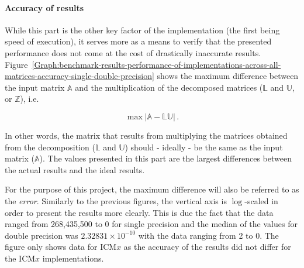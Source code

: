 \paragraph{Accuracy of results} While this part is the other key factor of the implementation (the first being speed of execution), it serves more as a means to verify that the presented performance does not come at the cost of drastically inaccurate results. Figure~\ref{Graph:benchmark-results-performance-of-implementations-across-all-matrices-accuracy-single-double-precision} shows the maximum difference between the input matrix $ \mathbb{A} $ and the multiplication of the decomposed matrices ($ \mathbb{L} $ and $ \mathbb{U} $, or $ \mathbb{Z} $), i.e.

\begin{equation}
	\max\left| \mathbb{A} - \mathbb{L}\mathbb{U}\right| \nonumber \,.
\end{equation}

In other words, the matrix that results from multiplying the matrices obtained from the decomposition ($ \mathbb{L} $ and $ \mathbb{U} $) should - ideally - be the same as the input matrix ($ \mathbb{A} $). The values presented in this part are the largest differences between the actual results and the ideal results.
\par For the purpose of this project, the maximum difference will also be referred to as the \textit{error}. Similarly to the previous figures, the vertical axis is $ \log $-scaled in order to present the results more clearly. This is due the fact that the data ranged from 268,435,500 to 0 for single precision and the median of the values for double precision was $ 2.32831\times10^{-10} $ with the data ranging from 2 to 0. The figure only shows data for ICM$ x $ as the accuracy of the results did not differ for the ICM$ x $ implementations.


